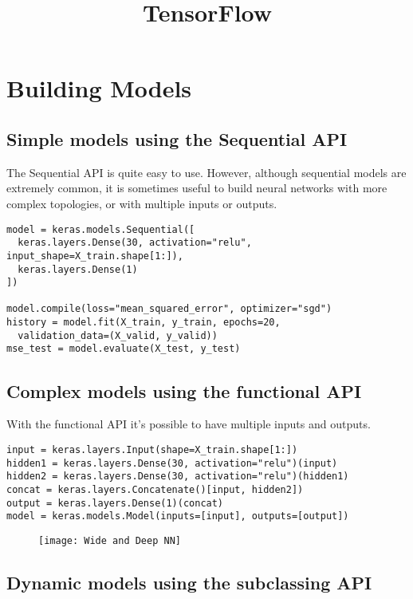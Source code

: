 \documentclass[french]{article}
\title{TensorFlow}
\begin{document}
\date{}

\maketitle

\section{Building Models}

\subsection{Simple models using the Sequential API}

The Sequential API is quite easy to use. However, although sequential models are extremely common, it is sometimes useful to build neural networks with more complex topologies, or with multiple inputs or outputs.

\begin{lstlisting}
model = keras.models.Sequential([
  keras.layers.Dense(30, activation="relu", input_shape=X_train.shape[1:]),
  keras.layers.Dense(1)
])

model.compile(loss="mean_squared_error", optimizer="sgd")
history = model.fit(X_train, y_train, epochs=20,
  validation_data=(X_valid, y_valid))
mse_test = model.evaluate(X_test, y_test)
\end{lstlisting}

\subsection{Complex models using the functional API}

With the functional API it's possible to have multiple inputs and outputs.

\begin{lstlisting}
input = keras.layers.Input(shape=X_train.shape[1:])
hidden1 = keras.layers.Dense(30, activation="relu")(input)
hidden2 = keras.layers.Dense(30, activation="relu")(hidden1)
concat = keras.layers.Concatenate()[input, hidden2])
output = keras.layers.Dense(1)(concat)
model = keras.models.Model(inputs=[input], outputs=[output])
\end{lstlisting}

\begin{figure}[h]
\texttt{[image: Wide and Deep NN]}
\centering
\end{figure}

\subsection{Dynamic models using the subclassing API}
\end{document}
